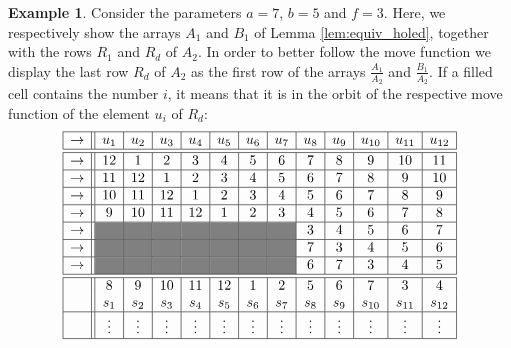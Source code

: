 \documentclass{amsart}
\theoremstyle{definition}
\newtheorem{ex}[prop]{Example}
\numberwithin{equation}{section}
\begin{document}
\begin{ex} 
Consider the parameters $a = 7$, $b=5$ and $f = 3$.
Here, we respectively show the arrays $A_1$ and $B_1$ of Lemma \ref{lem:equiv_holed}, together with the rows $R_1$ and $R_d$ of $A_2$. In order to better follow the move function we display the last row $R_d$ of $A_2$ as the first row of the arrays  $\frac{A_1}{A_2}$ and  $\frac{B_1}{A_2}$.
If a filled cell contains the number $i$, it means that it is in the orbit of the respective move function of the element $u_{i}$ of $R_d$:
\[
\begin{array}{|c||c|c|c|c|c|c|c|c|c|c|c|c|}\hline
\rightarrow&u_1&u_2&u_3&u_4&u_5&u_6&u_7&u_8&u_9&u_{10}&u_{11}&u_{12} \\ \hline \hline
\rightarrow&12&1&2&3&4&5&6&7&8&9&10&11 \\ \hline 
\rightarrow&11&12&1&2&3&4&5&6&7&8&9&10 \\ \hline 
\rightarrow&10&11&12&1&2&3&4&5&6&7&8&9 \\ \hline 
\rightarrow&9&10&11&12&1&2&3&4&5&6&7&8 \\ \hline 
\rightarrow&\cellcolor{gray}&\cellcolor{gray}&\cellcolor{gray}&\cellcolor{gray}&\cellcolor{gray}&\cellcolor{gray}&\cellcolor{gray}&3&4&5&6&7 \\ \hline 
\rightarrow&\cellcolor{gray}&\cellcolor{gray}&\cellcolor{gray}&\cellcolor{gray}&\cellcolor{gray}&\cellcolor{gray}&\cellcolor{gray}&7&3&4&5&6 \\ \hline 
\rightarrow&\cellcolor{gray}&\cellcolor{gray}&\cellcolor{gray}&\cellcolor{gray}&\cellcolor{gray}&\cellcolor{gray}\cellcolor{gray}&\cellcolor{gray}&6&7&3&4&5  \\ \hline  \hline
&8&9&10&11&12&1&2&5&6&7&3&4 \\ 
&s_1&s_2&s_3&s_4&s_5&s_6&s_7&s_8&s_9&s_{10}&s_{11}&s_{12} \\ \hline 
 & \vdots & \vdots & \vdots & \vdots & \vdots & \vdots & \vdots & \vdots & \vdots & \vdots & \vdots & \vdots   \\ \hline
\end{array}
\]


\end{ex}
\end{document}
